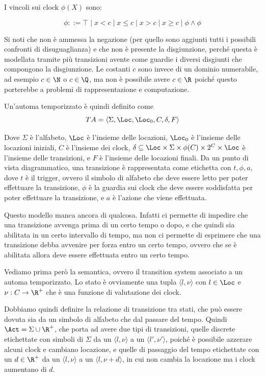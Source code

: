 I vincoli sui clock \(\phi(X)\) sono:

\[\phi ::= \top \mid x<c\mid x\leq c\mid x > c \mid x \geq c \mid \phi \land \phi\]

Si noti che non è ammessa la negazione (per quello sono aggiunti tutti i possibili confronti di disuguaglianza) e che non è presente la disgiunzione, perché questa è modellata tramite più transizioni avente come guardie i diversi disgiunti che compongono la disgiunzione. Le costanti \(c\) sono invece di un dominio numerabile, ad esempio \(c \in \N\) o \(c \in \Q\), ma non è possibile avere \(c \in \R\) poiché questo porterebbe a problemi di rappresentazione e computazione.

Un'automa temporizzato è quindi definito come
\[TA = \langle\Sigma, \Loc, \Loc_0,C,\delta,F\rangle\]

Dove \(\Sigma\) è l'alfabeto, \(\Loc\) è l'insieme delle locazioni, \(\Loc_0\) è l'insieme delle locazioni iniziali, \(C\) è l'insieme dei clock, \(\delta \subseteq \Loc \times \Sigma \times \phi(C) \times 2^C \times \Loc\) è l'insieme delle transizioni, e \(F\) è l'insieme delle locazioni finali. Da un punto di vista diagrammatico, una transizione è rappresentata come etichetta con \(t, \phi, a\), dove \(t\) è il trigger, ovvero il simbolo di alfabeto che deve essere letto per poter effettuare la transizione, \(\phi\) è la guardia sui clock che deve essere soddisfatta per poter effettuare la transizione, e \(a\) è l'azione che viene effettuata.


Questo modello manca ancora di qualcosa. Infatti ci permette di impedire che una transizione avvenga prima di un certo tempo o dopo, e che quindi sia abilitata in un certo intervallo di tempo, ma non ci permette di esprimere che una transizione debba avvenire per forza entro un certo tempo, ovvero che se è abilitata allora deve essere effettuata entro un certo tempo.

Vediamo prima però la semantica, ovvero il transition system associato a un automa temporizzato.
Lo stato è ovviamente una tupla \(\langle l, \nu\rangle\) con \(l \in \Loc\) e \(\nu: C \to \R^+\) che è una funzione di valutazione dei clock.

Dobbiamo quindi definire la relazione di transizione tra stati, che può essere dovuta sia da un simbolo di alfabeto che dal passare del tempo. Quindi \(\Act = \Sigma \cup \R^+\), che porta ad avere due tipi di transizioni, quelle discrete etichettate con simboli di \(\Sigma\) da un \(\langle l,\nu \rangle\) a un \(\langle l',\nu' \rangle\), poiché è possibile azzerare alcuni clock e cambiano locazione, e quelle di passaggio del tempo etichettate con un \(d \in \R^+\) da un \(\langle l,\nu \rangle\) a un \(\langle l,\nu + d\rangle\), in cui non cambia la locazione ma i clock aumentano di \(d\).

